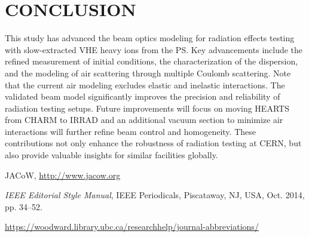 \documentclass[a4paper,
               biblatex,     %
               ]{jacow}
\begin{document}






\section{CONCLUSION}

This study has advanced the beam optics modeling for radiation effects testing with slow-extracted VHE heavy ions from the PS. Key advancements include the refined measurement of initial conditions, the characterization of the dispersion, and the modeling of air scattering through multiple Coulomb scattering. Note that the current air modeling excludes elastic and inelastic interactions. The validated beam model significantly improves the precision and reliability of radiation testing setups. Future improvements will focus on moving HEARTS from CHARM to IRRAD and an additional vacuum section to minimize air interactions will further refine beam control and homogeneity. These contributions not only enhance the robustness of radiation testing at CERN, but also provide valuable insights for similar facilities globally.


%
	{\printbibliography}%
	{%
	
	\begin{thebibliography}{9} %
	
		JACoW,
		\url{http://www.jacow.org}
	
		\textit{IEEE Editorial Style Manual},
		IEEE Periodicals, Piscataway,
		NJ, USA, Oct. 2014, pp. 34--52.

	\url{https://woodward.library.ubc.ca/researchhelp/journal-abbreviations/}

	\end{thebibliography}
} %
\end{document}
